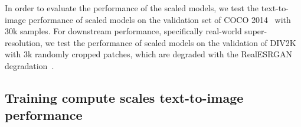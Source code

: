 In order to evaluate the performance of the scaled models, we test the text-to-image performance of scaled models on the validation set of COCO 2014~\cite{lin2014microsoft} with 30k samples.
For downstream performance, specifically real-world super-resolution, we test the performance of scaled models on the validation of DIV2K with 3k randomly cropped patches, which are degraded with the RealESRGAN degradation~\cite{wang2021real}.




\subsection{Training compute scales text-to-image performance}
\label{sec:scalingt2i}



